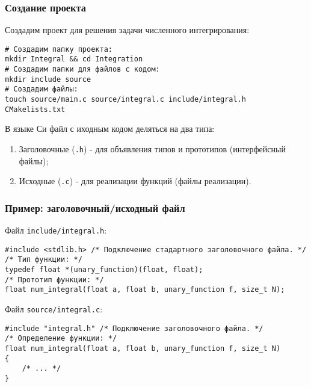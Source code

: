 \documentclass{beamer}
\begin{document}
    \begin{frame}[fragile]
        \frametitle{Создание проекта}
        \justifying
        Создадим проект для решения задачи численного интегрирования:
        \begin{verbatim}
# Создадим папку проекта:
mkdir Integral && cd Integration
# Создадим папки для файлов с кодом:
mkdir include source
# Создадим файлы:
touch source/main.c source/integral.c include/integral.h CMakelists.txt
        \end{verbatim}
        \par
        \justifying
        В языке Си файл с иходным кодом деляться на два типа:
        \begin{enumerate}
            \item Заголовочные ({\tt *.h}) - для объявления типов и прототипов (интерфейсный файлы);
            \item Исходные ({\tt *.c}) - для реализации функций (файлы реализации).  
        \end{enumerate} 
    \end{frame}
    \begin{frame}[fragile]
        \frametitle{Пример: заголовочный/исходный файл}
        Файл {\tt include/integral.h}:
        \begin{verbatim}
#include <stdlib.h> /* Подключение стадартного заголовочного файла. */
/* Тип функции: */
typedef float *(unary_function)(float, float);
/* Прототип функции: */
float num_integral(float a, float b, unary_function f, size_t N);
        \end{verbatim}
        Файл {\tt source/integral.c}:
        \begin{verbatim}
#include "integral.h" /* Подключение заголовочного файла. */
/* Определение функции: */
float num_integral(float a, float b, unary_function f, size_t N)
{
    /* ... */
}
        \end{verbatim}
    \end{frame}
\end{document}
